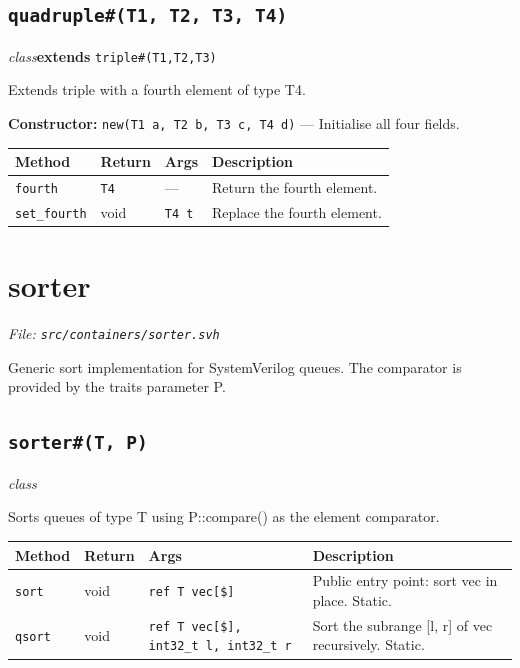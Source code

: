 \documentclass[11pt,letterpaper]{report}
\begin{document}
\subsection*{\texttt{quadruple\#(T1, T2, T3, T4)}}
\noindent\small\textit{class}\quad \textbf{extends} \texttt{triple\#(T1,T2,T3)}\par

Extends triple with a fourth element of type T4.

\noindent\textbf{Constructor:} \texttt{new(T1 a, T2 b, T3 c, T4 d)} --- Initialise all four fields.

\begin{xltabular}{\linewidth}{>{\small}p{1.35in} >{\small}p{1.25in} >{\small}p{0.95in} >{\small}X}
\toprule
\textbf{Method} & \textbf{Return} & \textbf{Args} & \textbf{Description} \\
\midrule
\endhead
\bottomrule
\endfoot
\texttt{fourth} & \texttt{T4} & --- & Return the fourth element. \\
\texttt{set\_fourth} & void & \texttt{T4 t} & Replace the fourth element. \\
\end{xltabular}

\section{sorter}
\noindent\small\textit{File: \texttt{src/containers/sorter.svh}}\par

Generic sort implementation for SystemVerilog queues. The comparator is provided by the traits parameter P.

\subsection*{\texttt{sorter\#(T, P)}}
\noindent\small\textit{class}\par

Sorts queues of type T using P::compare() as the element comparator.

\begin{xltabular}{\linewidth}{>{\small}p{1.35in} >{\small}p{1.25in} >{\small}p{0.95in} >{\small}X}
\toprule
\textbf{Method} & \textbf{Return} & \textbf{Args} & \textbf{Description} \\
\midrule
\endhead
\bottomrule
\endfoot
\texttt{sort} & void & \texttt{ref T vec[\$]} & Public entry point: sort vec in place. Static. \\
\texttt{qsort} & void & \texttt{ref T vec[\$], int32\_t l, int32\_t r} & Sort the subrange [l, r] of vec recursively. Static. \\
\end{xltabular}
\end{document}

